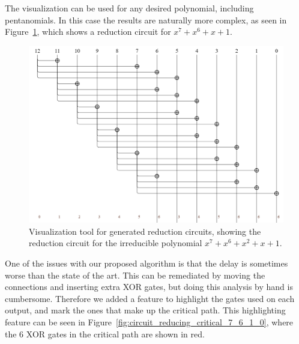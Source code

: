 The visualization can be used for any desired polynomial, including pentanomials. In this case the results are naturally more complex, as seen in Figure~\ref{fig:circuit_reducing_7_6_1_0}, which shows a reduction circuit for $x^7 + x^6 + x + 1$.

\begin{figure}
  \caption{Visualization tool for generated reduction circuits, showing the reduction circuit for the irreducible polynomial $x^7 + x^6 + x^2 + x + 1$.}
  \label{fig:circuit_reducing_7_6_1_0}
  \centering
  \includegraphics[width = 1\columnwidth]{figures/reducing-7-6-2-1-0.png}
\end{figure}

One of the issues with our proposed algorithm is that the delay is sometimes worse than the state of the art. This can be remediated by moving the connections and inserting extra XOR gates, but doing this analysis by hand is cumbersome. Therefore we added a feature to highlight the gates used on each output, and mark the ones that make up the critical path. This highlighting feature can be seen in Figure~\ref{fig:circuit_reducing_critical_7_6_1_0}, where the 6 XOR gates in the critical path are shown in red. \\

